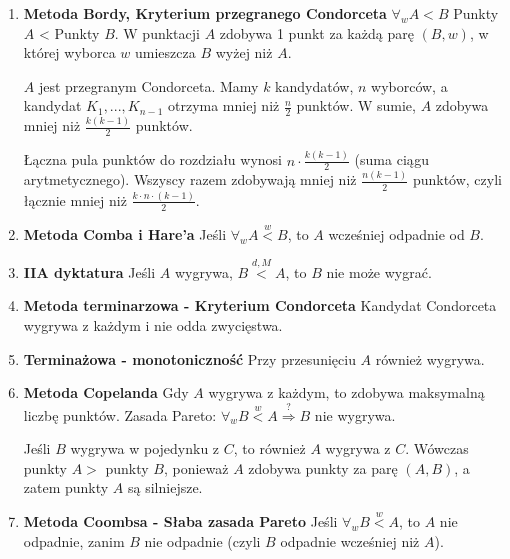 \documentclass[12pt,a4paper]{article}
\theoremstyle{break}
\begin{document}
		\begin{enumerate}[D1)]
			\item \textbf{Metoda Bordy, Kryterium przegranego Condorceta} $\forall_w A<B$ Punkty $A$ < Punkty $B$. W punktacji $A$ zdobywa 1 punkt za każdą parę $(B, w)$, w której wyborca $w$ umieszcza $B$ wyżej niż $A$. 
			
			$A$ jest przegranym Condorceta. Mamy $k$ kandydatów, $n$ wyborców, a kandydat $K_1,...,K_{n-1}$ otrzyma mniej niż $\frac{n}{2}$ punktów. W sumie, $A$ zdobywa mniej niż $\frac{k(k-1)}{2}$ punktów.
			
			Łączna pula punktów do rozdziału wynosi $n\cdot\frac{k(k-1)}{2}$ (suma ciągu arytmetycznego). Wszyscy razem zdobywają mniej niż $\frac{n(k-1)}{2}$ punktów, czyli łącznie mniej niż $\frac{k\cdot n \cdot (k-1)}{2}$.
			
			\item \textbf{Metoda Comba i Hare'a} Jeśli $\forall_w A \overset{w}{<} B$, to $A$ wcześniej odpadnie od $B$.
			
			\item \textbf{IIA dyktatura} Jeśli $A$ wygrywa, $B \overset{d,M}{<} A$, to $B$ nie może wygrać.
			
			\item \textbf{Metoda terminarzowa - Kryterium Condorceta} Kandydat Condorceta wygrywa z każdym i nie odda zwycięstwa.
			
			\item \textbf{Terminażowa - monotoniczność} Przy przesunięciu $A$ również wygrywa.
			
			\item \textbf{Metoda Copelanda} Gdy $A$ wygrywa z każdym, to zdobywa maksymalną liczbę punktów. Zasada Pareto: $\forall_w B \overset{w}{<} A \overset{?}{\Rightarrow} B$ nie wygrywa.
			
			Jeśli $B$ wygrywa w pojedynku z $C$, to również $A$ wygrywa z $C$. Wówczas punkty $A >$ punkty $B$, ponieważ $A$ zdobywa punkty za parę $(A, B)$, a zatem punkty $A$ są silniejsze.
			
			\item \textbf{Metoda Coombsa - Słaba zasada Pareto} Jeśli $\forall_w B \overset{w}{<} A$, to $A$ nie odpadnie, zanim $B$ nie odpadnie (czyli $B$ odpadnie wcześniej niż $A$).
		\end{enumerate}
		
\end{document}

